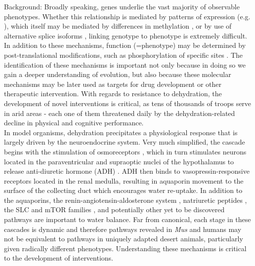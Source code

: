 \documentclass[12pt]{article}
\begin{document}
Background: Broadly speaking, genes underlie the vast majority of observable phenotypes. Whether this relationship is mediated by patterns of expression (e.g. \citealt{Teets:2012gt}), which itself may be mediated by differences in methylation \citep{Brenet:2011dq}, or by use of alternative splice isoforms \citep{Yukutake:2010ia}, linking genotype to phenotype is extremely difficult. In addition to these mechanisms, function (=phenotype) may be determined by post-translational modifications, such as phosphorylation of specific sites \citep{Anonymous:2009gb}. The identification of these mechanisms is important not only because in doing so we gain a deeper understanding of evolution, but also because these molecular mechanisms may be later used as targets for drug development or other therapeutic intervention. With regards to resistance to dehydration, the development of novel interventions is critical, as tens of thousands of troops serve in arid areas - each one of them threatened daily by the dehydration-related decline in physical and cognitive performance. \\

In model organisms, dehydration precipitates a physiological response that is largely driven by the neuroendocrine system. Very much simplified, the cascade begins with the stimulation of osmoreceptors \citep{Arsenijevic:1985bi}, which in turn stimulates neurons located in the paraventricular and supraoptic nuclei of the hypothalamus to release anti-diuretic hormone (ADH) \citep{Zingg:1986vb}. ADH then binds to vasopressin-responsive receptors located in the renal medulla, resulting in aquaporin movement to the surface of the collecting duct \citep{Nielsen:1995uq} which encourages water re-uptake. In addition to the aquaporins, the renin-angiotensin-aldosterone system \citep{Gubler:2010bh}, natriuretic peptides \citep{Totsune:1994kf}, the SLC and mTOR families \citep{Ortells:2012go}, and potentially other yet to be discovered pathways are important to water balance. Far from canonical, each stage in these cascades is dynamic and therefore pathways revealed in \textit{Mus} and humans may not be equivalent to pathways in uniquely adapted desert animals, particularly given radically different phenotypes. Understanding these mechanisms is critical to the development of interventions. \\
\end{document}
